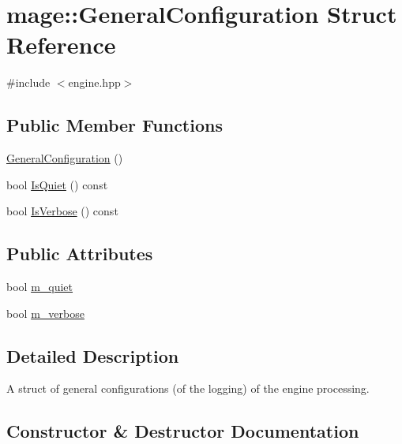 \hypertarget{structmage_1_1_general_configuration}{}\section{mage\+:\+:General\+Configuration Struct Reference}
\label{structmage_1_1_general_configuration}


{\ttfamily \#include $<$engine.\+hpp$>$}

\subsection*{Public Member Functions}
\begin{DoxyCompactItemize}
\item 
\hyperlink{structmage_1_1_general_configuration_a9a8040da771683b795ad9016ed0dd733}{General\+Configuration} ()
\item 
bool \hyperlink{structmage_1_1_general_configuration_a51e37e3d7473c16fa90efa7501f54ebc}{Is\+Quiet} () const
\item 
bool \hyperlink{structmage_1_1_general_configuration_affb1e42d744f4f75d244dc63278a4e94}{Is\+Verbose} () const
\end{DoxyCompactItemize}
\subsection*{Public Attributes}
\begin{DoxyCompactItemize}
\item 
bool \hyperlink{structmage_1_1_general_configuration_aaa638cb4be1dfc8d3af3fddfb7933773}{m\+\_\+quiet}
\item 
bool \hyperlink{structmage_1_1_general_configuration_aacc88850ee46834ab0ee52bbfa8a3a80}{m\+\_\+verbose}
\end{DoxyCompactItemize}


\subsection{Detailed Description}
A struct of general configurations (of the logging) of the engine processing. 

\subsection{Constructor \& Destructor Documentation}
\hypertarget{structmage_1_1_general_configuration_a9a8040da771683b795ad9016ed0dd733}{}\label{structmage_1_1_general_configuration_a9a8040da771683b795ad9016ed0dd733} 
